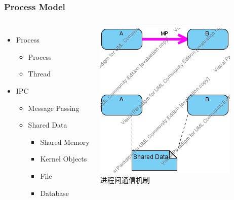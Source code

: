 \begin{frame}
  \frametitle{Process Model}
  \begin{columns}
    \begin{itemize}
      \item Process
        \begin{itemize}
          \item Process
          \item Thread
        \end{itemize}
      \item \textcolor[rgb]{1.00,0.00,0.00}{IPC}
        \begin{itemize}
          \item Message Passing
          \item Shared Data
            \begin{itemize}
              \item Shared Memory
              \item Kernel Objects
              \item File
              \item Database
            \end{itemize}
        \end{itemize}
    \end{itemize}
    \centering\includegraphics[scale=0.4]{images/ipc.png}\\
    \centering\textcolor[rgb]{0.00,0.00,1.00}{进程间通信机制}
  \end{columns}
\end{frame}

